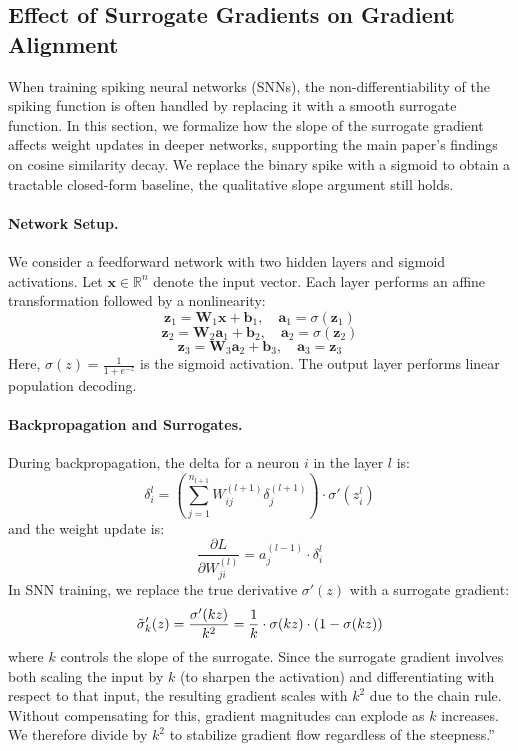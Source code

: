 \subsection{Effect of Surrogate Gradients on Gradient Alignment} \label{sup:surrgrad}

When training spiking neural networks (SNNs), the non-differentiability of the spiking function is often handled by replacing it with a smooth surrogate function. In this section, we formalize how the slope of the surrogate gradient affects weight updates in deeper networks, supporting the main paper’s findings on cosine similarity decay. We replace the binary spike with a sigmoid to obtain a tractable closed-form baseline, the qualitative slope argument still holds.

\paragraph{Network Setup.}
We consider a feedforward network with two hidden layers and sigmoid activations. Let \( \mathbf{x} \in \mathbb{R}^n \) denote the input vector. Each layer performs an affine transformation followed by a nonlinearity:
\[
\mathbf{z}_1 = \mathbf{W}_1 \mathbf{x} + \mathbf{b}_1, \quad \mathbf{a}_1 = \sigma(\mathbf{z}_1)
\]
\[
\mathbf{z}_2 = \mathbf{W}_2 \mathbf{a}_1 + \mathbf{b}_2, \quad \mathbf{a}_2 = \sigma(\mathbf{z}_2)
\]
\[
\mathbf{z}_3 = \mathbf{W}_3 \mathbf{a}_2 + \mathbf{b}_3, \quad \mathbf{a}_3 = \mathbf{z}_3
\]
Here, \( \sigma(z) = \frac{1}{1 + e^{-z}} \) is the sigmoid activation. The output layer performs linear population decoding.

\paragraph{Backpropagation and Surrogates.}
During backpropagation, the delta for a neuron \( i \) in the layer \( l \) is:
\[
\delta^l_i = \left( \sum_{j=1}^{n_{l+1}} W^{(l+1)}_{ij} \delta^{(l+1)}_j \right) \cdot \sigma'(z^l_i)
\]
and the weight update is:
\[
\frac{\partial L}{\partial W^{(l)}_{ji}} = a^{(l-1)}_j \cdot \delta^l_i
\]
In SNN training, we replace the true derivative \( \sigma'(z) \) with a surrogate gradient:
\[
\Tilde{\sigma}'_k(z) = \frac{\sigma'(kz)}{k^2} = \frac{1}{k} \cdot \sigma(kz) \cdot (1 - \sigma(kz))
\]
where \( k \) controls the slope of the surrogate.  Since the surrogate gradient involves both scaling the input by $k$ (to sharpen the activation) and differentiating with respect to that input, the resulting gradient scales with $k^2$ due to the chain rule. Without compensating for this, gradient magnitudes can explode as $k$ increases. We therefore divide by $k^2$ to stabilize gradient flow regardless of the steepness.”

